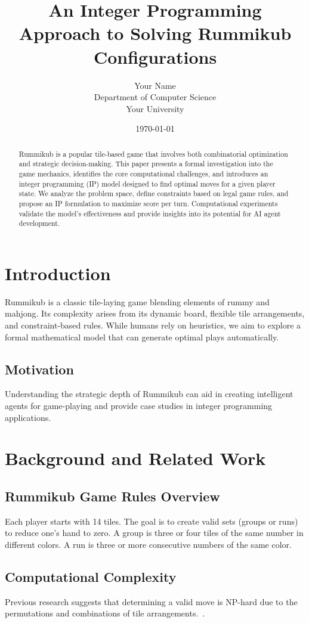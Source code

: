 \documentclass[12pt]{article}
\title{An Integer Programming Approach to Solving Rummikub Configurations}
\author{Your Name \\ Department of Computer Science \\ Your University}
\date{\today}
\begin{document}
\sloppy
\maketitle

\begin{abstract}
\sloppy
Rummikub is a popular tile-based game that involves both combinatorial optimization and strategic decision-making. This paper presents a formal investigation into the game mechanics, identifies the core computational challenges, and introduces an integer programming (IP) model designed to find optimal moves for a given player state. We analyze the problem space, define constraints based on legal game rules, and propose an IP formulation to maximize score per turn. Computational experiments validate the model’s effectiveness and provide insights into its potential for AI agent development.
\end{abstract}

\section{Introduction}
Rummikub is a classic tile-laying game blending elements of rummy and mahjong. Its complexity arises from its dynamic board, flexible tile arrangements, and constraint-based rules. While humans rely on heuristics, we aim to explore a formal mathematical model that can generate optimal plays automatically.

\subsection{Motivation}
Understanding the strategic depth of Rummikub can aid in creating intelligent agents for game-playing and provide case studies in integer programming applications.

\section{Background and Related Work}
\subsection{Rummikub Game Rules Overview}
Each player starts with 14 tiles. The goal is to create valid sets (groups or runs) to reduce one's hand to zero. A group is three or four tiles of the same number in different colors. A run is three or more consecutive numbers of the same color.

\subsection{Computational Complexity}
Previous research suggests that determining a valid move is NP-hard due to the permutations and combinations of tile arrangements.~\cite{rummikub_complexity}.
\end{document}
